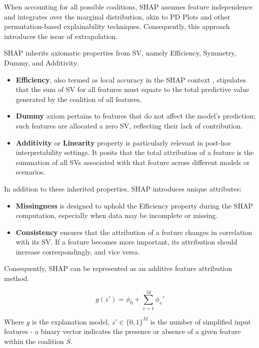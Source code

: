 When accounting for all possible coalitions, \gls{SHAP} assumes feature independence and integrates over the marginal distribution, akin to PD Plots and other permutation-based explainability techniques. Consequently, this approach introduces the issue of extrapolation.

\gls{SHAP} inherits axiomatic properties from SV, namely Efficiency, Symmetry, Dummy, and Additivity.

\begin{itemize}
    \item \textbf{Efficiency}, also termed as local accuracy in the \gls{SHAP} context \cite{10.5555/3295222.3295230}, stipulates that the sum of SV for all features must equate to the total predictive value generated by the coalition of all features.
  
    \item \textbf{Dummy} axiom pertains to features that do not affect the model's prediction; such features are allocated a zero SV, reflecting their lack of contribution.

    \item \textbf{Additivity} or \textbf{Linearity} property is particularly relevant in post-hoc interpretability settings. It posits that the total attribution of a feature is the summation of all SVs associated with that feature across different models or scenarios.
\end{itemize}

In addition to these inherited properties, \gls{SHAP} introduces unique attributes:

\begin{itemize}
    \item \textbf{Missingness} is designed to uphold the Efficiency property during the \gls{SHAP} computation, especially when data may be incomplete or missing.
  
    \item \textbf{Consistency} ensures that the attribution of a feature changes in correlation with its SV. If a feature becomes more important, its attribution should increase correspondingly, and vice versa.
\end{itemize}

Consequently, \gls{SHAP} can be represented as an additive feature attribution method.

\begin{equation}
g(z')=\phi_0+\sum_{v=1}^M\phi_v'
\end{equation}

Where $g$ is the explanation model, $z'\in\{0,1\}^M$ is the number of simplified input features - a binary vector indicates the presence or absence of a given feature within the coalition $S$.



